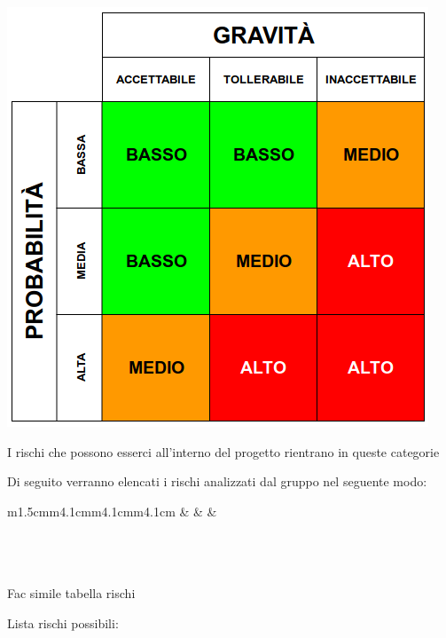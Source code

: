 	\begin{center}
		\includegraphics[scale=0.5]{img/tabella.png}
	\end{center}


	I rischi che possono esserci all'interno del progetto rientrano in queste categorie
	
	Di seguito verranno elencati i rischi analizzati dal gruppo nel seguente modo:\\
	
	\begin{table}[H]
		\begin{risktable}{\columnwidth}{m{1.5cm}m{4.1cm}m{4.1cm}m{4.1cm}}
			 & 
			 & 
			 & 
			 \\
			\hline
			\\
			\hline
			\\
			\hline
			\\
		\end{risktable}
		\caption{Fac simile tabella rischi}
	\end{table}
	
	Lista rischi possibili: 
	
